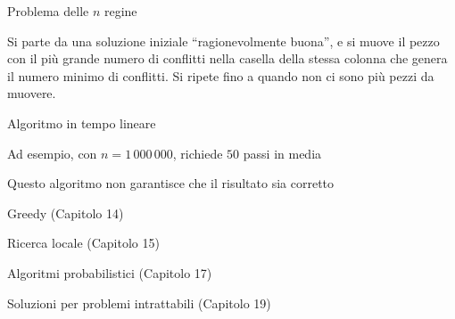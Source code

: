 \begin{frame}{Problema delle $n$ regine}

\vspace{-9pt}
\begin{myboxtitle}
Si parte da una soluzione iniziale “ragionevolmente buona”, e si muove
il pezzo con il più grande numero di conflitti nella casella della stessa 
colonna che genera il numero minimo di conflitti. Si ripete fino a quando non ci
sono più pezzi da muovere.
\end{myboxtitle}
	
\BIL
\item Algoritmo in tempo lineare
\item Ad esempio, con $n=1\,000\,000$, richiede $50$ passi in media
\item Questo algoritmo non garantisce che il risultato sia corretto
 \BI
 \item Greedy (Capitolo 14)
 \item Ricerca locale (Capitolo 15)
 \item Algoritmi probabilistici (Capitolo 17)
 \item Soluzioni per problemi intrattabili (Capitolo 19)
 \EI	
\EIL

\end{frame}

